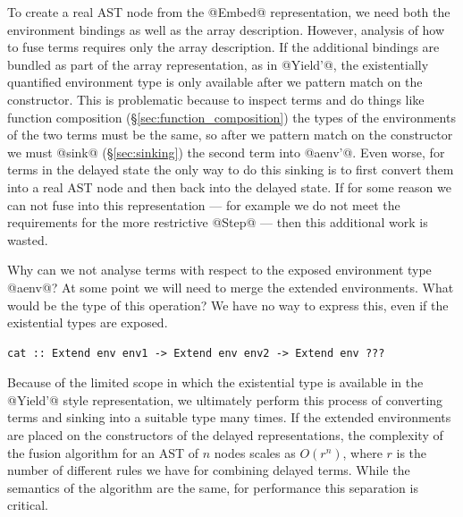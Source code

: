 To create a real AST node from the @Embed@
representation, we need both the environment bindings as well as the array
description. However, analysis of how to fuse terms requires only the array
description. If the additional bindings are bundled as part of the array
representation, as in @Yield'@, the existentially quantified environment
type is only available after we pattern match on the constructor. This is
problematic because to inspect terms and do things like function composition
(\S\ref{sec:function_composition}) the types of the environments of the two
terms must be the same, so after we pattern match on the constructor we must
@sink@ (\S\ref{sec:sinking}) the second term into @aenv'@. Even worse,
for terms in the delayed state the only way to do this sinking is to first
convert them into a real AST node and then back into the delayed state. If for
some reason we can not fuse into this representation --- for example we do not
meet the requirements for the more restrictive @Step@ --- then this
additional work is wasted.

Why can we not analyse terms with respect to the exposed environment type
@aenv@? At some point we will need to merge the extended environments. What
would be the type of this operation? We have no way to express this, even if the
existential types are exposed.
%
\begin{lstlisting}[style=haskell]
cat :: Extend env env1 -> Extend env env2 -> Extend env ???
\end{lstlisting}

Because of the limited scope in which the existential type is available in the
@Yield'@ style representation, we ultimately perform this process of converting
terms and sinking into a suitable type many times. If the extended environments
are placed on the constructors of the delayed representations, the complexity of
the fusion algorithm for an AST of $n$ nodes scales as $O(r^n)$, where $r$ is
the number of different rules we have for combining delayed terms. While the
semantics of the algorithm are the same, for performance this separation is
critical.

